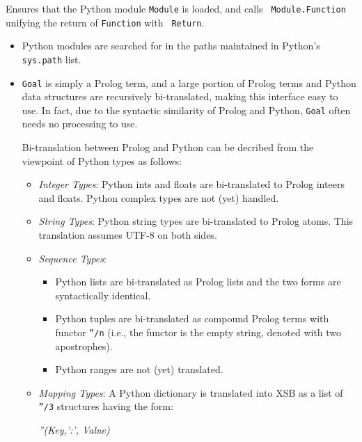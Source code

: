 \begin{description}

%
 Ensures that the Python module {\tt Module} is loaded, and calls {\tt
   Module.Function} unifying the return of {\tt Function} with {\tt
   Return}. 

 \begin{itemize}
   \item Python modules are searched for in the paths maintained in
     Python's {\tt sys.path} list.
   \item {\tt Goal} is simply a Prolog term, and a large portion of
     Prolog terms and Python data structures are recursively
     bi-translated, making this interface easy to use.  In fact, due
     to the syntactic similarity of Prolog and Python, {\tt Goal}
     often needs no processing to use.

     Bi-translation between Prolog and Python can be decribed from the
     viewpoint of Python types as follows:
     \begin{itemize}
       \item {\em Integer Types}: Python ints and floats are bi-translated
         to Prolog inteers and floats.  Python complex types are not (yet) 
         handled.  
       \item {\em String Types}: Python string types are bi-translated
         to Prolog atoms.  This translation assumes UTF-8 on both
         sides.
       \item {\em Sequence Types}:
         \begin{itemize}
           \item Python lists are bi-translated as Prolog lists and
             the two forms are syntactically identical.
           \item Python tuples are bi-translated as compound Prolog
             terms with functor {\tt ''/n} (i.e., the functor is the
             empty string, denoted with two apostrophes).
             \item Python ranges are not (yet) translated.
         \end{itemize}
       \item {\em Mapping Types}: A Python dictionary is translated
         into XSB as a list of {\tt ''/3} structures having the form:

         {\em ''(Key,':', Value)}


\end{itemize}
\end{itemize}
\end{description}
